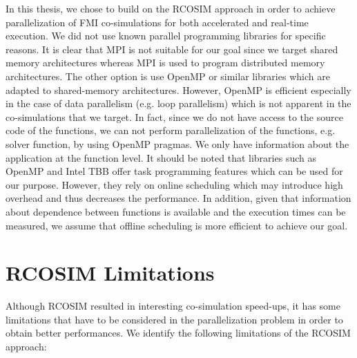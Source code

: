 In this thesis, we chose to build on the RCOSIM approach in order to achieve parallelization of FMI co-simulations for both accelerated and real-time execution. We did not use known parallel programming libraries for specific reasons. It is clear that MPI is not suitable for our goal since we target shared memory architectures whereas MPI is used to program distributed memory architectures. The other option is use OpenMP or similar libraries which are adapted to shared-memory architectures. However, OpenMP is efficient especially in the case of data parallelism (e.g. loop parallelism) which is not apparent in the co-simulations that we target. In fact, since we do not have access to the source code of the functions, we can not perform parallelization of the functions, e.g. solver function, by using OpenMP pragmas. We only have information about the application at the function level. It should be noted that libraries such as OpenMP and Intel TBB offer task programming features which can be used for our purpose. However, they rely on online scheduling which may introduce high overhead and thus decreases the performance. In addition, given that information about dependence between functions is available and the execution times can be measured, we assume that offline scheduling is more efficient to achieve our goal.   

\section{RCOSIM Limitations}

Although RCOSIM resulted in interesting co-simulation speed-ups, it has some limitations that have to be considered in the parallelization problem in order to obtain better performances. We identify the following limitations of the RCOSIM approach:

